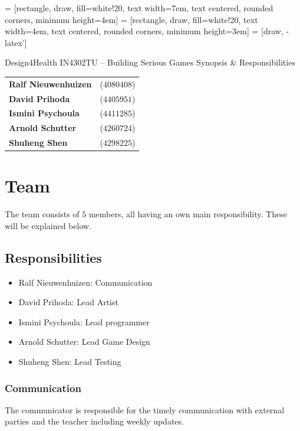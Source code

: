 \documentclass[a4paper,11pt,notitlepage]{report}
\begin{document}
 = [rectangle, draw, fill=white!20, 
    text width=7em, text centered, rounded corners, minimum height=4em]
 = [rectangle, draw, fill=white!20, 
    text width=4em, text centered, rounded corners, minimum height=3em]
 = [draw, -latex']
		
\begin{center}
\vskip 1cm
{\Huge Design4Health \vskip 2mm}
{\Large IN4302TU -- Building Serious Games \vskip 1cm}
{\Huge Synopsis \& Responsibilities \vskip 1cm}

\begin{tabular}{ l l }
\textbf{Ralf Nieuwenhuizen} & ($4080408$) \\
\textbf{David Prihoda} & ($4405951$) \\
\textbf{Ismini Psychoula} & ($4411285$) \\ 
\textbf{Arnold Schutter} & ($4260724$) \\ 
\textbf{Shuheng Shen} & ($4298225$)
\end{tabular} 

\end{center}


\chapter{Team}

The team consists of $5$ members, all having an own main responsibility. These will be explained below.

\section{Responsibilities}

\begin{itemize}
	\item Ralf Nieuwenhuizen: Communication
	\item David Prihoda: Lead Artist
	\item Ismini Psychoula: Lead programmer
	\item Arnold Schutter: Lead Game Design
	\item Shuheng Shen: Lead Testing
\end{itemize}

\subsection{Communication}
The communicator is responsible for the timely communication with external parties and the teacher including weekly updates. 
\end{document}
